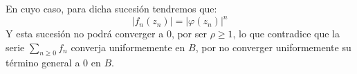 \begin{ejercicio}
\begin{description}
\begin{description}
                        En cuyo caso, para dicha sucesión tendremos que:
                        \begin{equation*}
                            |f_n(z_n)| = {|\varphi(z_n)|}^{n}
                        \end{equation*}
                        Y esta sucesión no podrá converger a 0, por ser $\rho \geq 1$, lo que contradice que la serie $\sum\limits_{n\geq 0} f_n$ converja uniformemente en $B$, por no converger uniformemente su término general a 0 en $B$.
                \end{description}
        \end{description}

\end{ejercicio}
